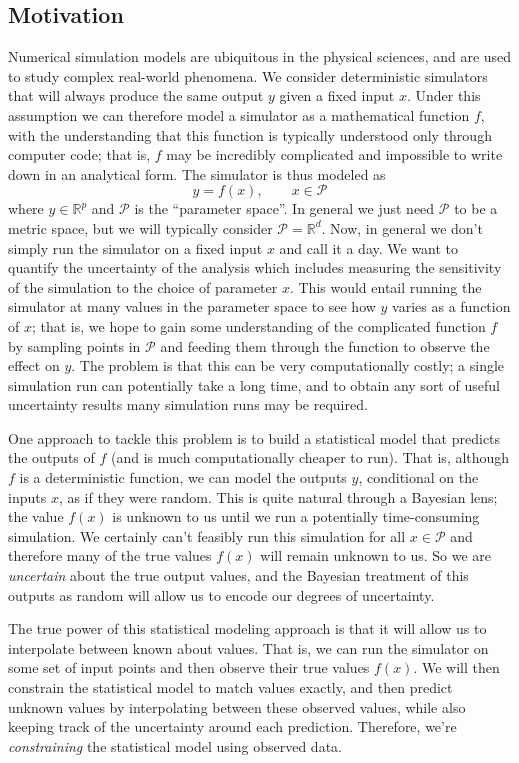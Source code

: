 \documentclass[12pt]{article}
\newcommand{\R}{\mathcal{R}}
\def\R{\mathbb{R}}
\begin{document}
\subsection{Motivation}
Numerical simulation models are ubiquitous in the physical sciences, and are used to study complex real-world phenomena. We consider 
deterministic simulators that will always produce the same output $y$ given a fixed input $x$. Under this assumption we can therefore model 
a simulator as a mathematical function $f$, with the understanding that this function is typically understood only through computer code; that is, 
$f$ may be incredibly complicated and impossible to write down in an analytical form. The simulator is thus modeled as 
\[y = f(x), \qquad x \in \mathcal{P}\]
where $y \in \R^p$ and $\mathcal{P}$ is the ``parameter space''. In general we just need $\mathcal{P}$ to be a metric space, but we will typically 
consider $\mathcal{P} = \R^d$. Now, in general we don't simply run the simulator on a fixed input $x$ and call it a day. We want to quantify the uncertainty 
of the analysis which includes measuring the sensitivity of the simulation to the choice of parameter $x$. This would entail running the simulator at many 
values in the parameter space to see how $y$ varies as a function of $x$; that is, we hope to gain some understanding of the complicated function $f$ by 
sampling points in $\mathcal{P}$ and feeding them through the function to observe the effect on $y$. The problem is that this can be very computationally costly; 
a single simulation run can potentially take a long time, and to obtain any sort of useful uncertainty results many simulation runs may be required. 

One approach to tackle this problem is to build a statistical model that predicts the outputs of $f$ (and is much computationally cheaper to run). That is, although $f$ 
is a deterministic function, we can model the outputs $y$, conditional on the inputs $x$, as if they were random. This is quite natural through a Bayesian lens; the value 
$f(x)$ is unknown to us until we run a potentially time-consuming simulation. We certainly can't feasibly run this simulation for all $x \in \mathcal{P}$ and therefore many 
of the true values $f(x)$ will remain unknown to us. So we are \textit{uncertain} about the true output values, and the Bayesian treatment of this outputs as random will
allow us to encode our degrees of uncertainty. 

The true power of this statistical modeling approach is that it will allow us to interpolate between known about values. That is, we can run the simulator on some set of 
input points and then observe their true values $f(x)$. We will then constrain the statistical model to match values exactly, and then predict unknown values by interpolating 
between these observed values, while also keeping track of the uncertainty around each prediction. Therefore, we're \textit{constraining} the statistical model using observed
data. 
\end{document}
